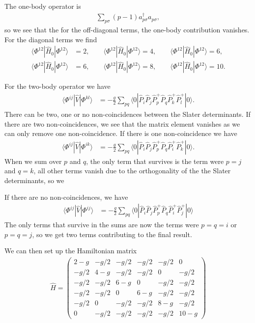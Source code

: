 \documentclass[a4paper, 11pt, notitlepage, english]{article}
\newcommand{\op}[1]{\hat{#1}}
\newcommand{\braopket}[3]{\langle #1 | {#2} | #3 \rangle}
\begin{document}
The one-body operator is
\begin{align*}
\sum_{p\sigma} (p-1)a_{p\sigma}^\dagger a_{p\sigma},
\end{align*}
so we see that the for the off-diagonal terms, the one-body contribution vanishes. For the diagonal terms we find
\begin{align*}
\braopket{\Phi^{12}}{\op{H}_0}{\Phi^{12}} &= 2, \qquad \braopket{\Phi^{12}}{\op{H}_0}{\Phi^{12}} = 4, \qquad \braopket{\Phi^{12}}{\op{H}_0}{\Phi^{12}} = 6, \\
\braopket{\Phi^{12}}{\op{H}_0}{\Phi^{12}} &= 6, \qquad \braopket{\Phi^{12}}{\op{H}_0}{\Phi^{12}} = 8, \qquad \braopket{\Phi^{12}}{\op{H}_0}{\Phi^{12}} = 10.
\end{align*}

For the two-body operator we have
\begin{align*}
\braopket{\Phi^{ij}}{\op{V}}{\Phi^{kl}} &= -\frac{g}{2}\sum_{pq}\braopket{0}{\op{P}_i \op{P}_j \op{P}^+_p \op{P}_q \op{P}^+_k \op{P}^+_l}{0}.
\end{align*}
There can be two, one or no non-coincidences between the Slater determinants. If there are two non-coincidences, we see that the matrix element vanishes as we can only remove one non-coincidence. If there is one non-coincidence we have
\begin{align*}
\braopket{\Phi^{ij}}{\op{V}}{\Phi^{ik}} &= -\frac{g}{2}\sum_{pq}\braopket{0}{\op{P}_i \op{P}_j \op{P}^+_p \op{P}_q \op{P}^+_i \op{P}^+_k}{0}.
\end{align*}
When we sum over $p$ and $q$, the only term that survives is the term were $p=j$ and $q=k$, all other terms vanish due to the orthogonality of the the Slater determinants, so we 

If there are no non-coincidences, we have
\begin{align*}
\braopket{\Phi^{ij}}{\op{V}}{\Phi^{ij}} &= -\frac{g}{2}\sum_{pq}\braopket{0}{\op{P}_i \op{P}_j \op{P}^+_p \op{P}_q \op{P}^+_i \op{P}^+_j}{0}
\end{align*}
The only terms that survive in the sums are now the terms were $p=q=i$ or $p=q=j$, so we get two terms contributing to the final result.

We can then set up the Hamiltonian matrix
\begin{align*}
\op{H} = \begin{pmatrix}
2 - g &  -g/2 & -g/2  & -g/2  & -g/2  & 0     \\
-g/2  & 4 - g & -g/2  & -g/2  & 0     & -g/2  \\
-g/2  & -g/2  & 6 - g &	0     & -g/2  & -g/2  \\              
-g/2  & -g/2  & 0     & 6 - g &	-g/2  & -g/2  \\                         
-g/2  &	0	  & -g/2  & -g/2  & 8 - g & -g/2  \\
0     &  -g/2 & -g/2  & -g/2  &  -g/2 & 10 - g 
\end{pmatrix}
\end{align*}
\end{document}

